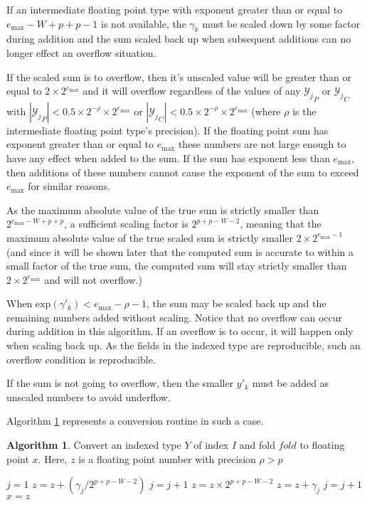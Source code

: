 \documentclass[12pt]{article}
\providecommand{\exp}{\ensuremath{\text{exp}}}
\providecommand{\max}{\ensuremath{\text{max}}}
\theoremstyle{definition}
\newtheorem{alg}{Algorithm}[section]
\numberwithin{equation}{section}
\begin{document}
    If an intermediate floating point type with exponent greater than or equal to $e_{\max} - W + p + p - 1$ is not available, the $\gamma_k$ must be scaled down by some factor during addition and the sum scaled back up when subsequent additions can no longer effect an overflow situation.

    If the scaled sum is to overflow, then it's unscaled value will be greater than or equal to $2 \times 2^{e_{\max}}$ and it will overflow regardless of the values of any ${\mathcal{Y}_j}_P$ or ${\mathcal{Y}_j}_C$ with $|{\mathcal{Y}_j}_P| < 0.5 \times 2^{-\rho} \times 2^{e_{\max}}$ or $|{\mathcal{Y}_j}_C| < 0.5 \times 2^{-\rho} \times 2^{e_{\max}}$ (where $\rho$ is the intermediate floating point type's precision). If the floating point sum has exponent greater than or equal to $e_{\max}$ these numbers are not large enough to have any effect when added to the sum. If the sum has exponent less than $e_{\max}$, then additions of these numbers cannot cause the exponent of the sum to exceed $e_{\max}$ for similar reasons.

    As the maximum absolute value of the true sum is strictly smaller than $2^{e_{\max} - W + p + p}$, a sufficient scaling factor is $2^{p + p - W - 2}$, meaning that the maximum absolute value of the true scaled sum is strictly smaller $2 \times 2^{e_{\max} - 1}$ (and since it will be shown later that the computed sum is accurate to within a small factor of the true sum, the computed sum will stay strictly smaller than $2 \times 2^{e_{\max}}$ and will not overflow.)

  When $\exp(\gamma'_k) < e_{\max} - \rho - 1$, the sum may be scaled back up and the remaining numbers added without scaling. Notice that no overflow can occur during addition in this algorithm. If an overflow is to occur, it will happen only when scaling back up. As the fields in the indexed type are reproducible, such an overflow condition is reproducible.

    If the sum is not going to overflow, then the smaller $y'_k$ must be added as unscaled numbers to avoid underflow.

    Algorithm \ref{alg:conv2floatoverflow} represents a conversion routine in such a case.

    \begin{alg}
      Convert an indexed type $Y$ of index $I$ and fold $fold$ to floating point $x$. Here, $z$ is a floating point number with precision $\rho > p$
      \begin{algorithmic}[1]
          \State $j = 1$
          \While{$j \leq 2 \times fold$ and $\exp(\gamma_j) \geq e_{\max} - \rho - 1$}
            \State $z = z + (\gamma_j / 2^{p + p - W - 2})$
            \State $j = j + 1$
          \EndWhile
          \State $z = z \times 2^{p + p - W - 2}$
            \State $z = z + \gamma_j$
            \State $j = j + 1$
          \EndWhile
          \State $x = z$
        \EndFunction
      \end{algorithmic}
      \label{alg:conv2floatoverflow}
    \end{alg}
\end{document}
